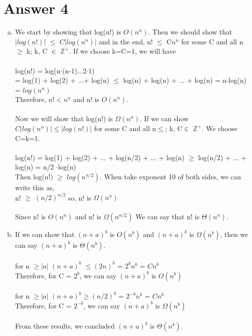 \documentclass[11pt]{article}
\begin{document}
\section*{Answer 4}
    \begin{enumerate}[(a)]
        \item 
            We start by showing that log(n!) is $O(n^n)$. Then we should show that $|log(n!)|$ $\leq$ $C|log(n^n)|$ and in the end, n! $\leq$ C$n^n$ for some C and all n $\geq$ k; k, C $\in$ $\mathbb{Z}^+$. If we choose k=C=1, we will have\\
            \\
            log(n!) = log(n$\cdot$(n-1)...2$\cdot$1) \\
            = log(1) + log(2) + ...+ log(n) $\leq$ log(n) + log(n) + ... + log(n) = n$\cdot$log(n) = $log(n^n)$\\
            Therefore, $n! < n^n$ \:\:\: and n! is $O(n^n)$.\\\\
            Now we will show that  log(n!) is $\Omega(n^n)$. If we can show $C|log(n^n)| \leq |log(n!)|$ for some C and all n$\leq$; k, C$\in$ $\mathbb{Z}^+$. We choose C=k=1.\\\\
            log(n!) = log(1) + log(2) + ... + log(n/2) + ... + log(n) $\geq$ log(n/2) + ... + log(n) = n/2 $\cdot$log(n)\\
            Then log(n!) $\geq$ $log(n^{n/2})$. When take exponent 10 of both sides, we can write this as,\\
            n! $\geq$ $(n/2)^{n/2}$ \:\:\: so, n! is $\Omega(n^{n})$\\\\
            Since n! is $O(n^n)$ and n! is $\Omega(n^{n/2})$ We can say that n! is $\Theta(n^n)$.\\
            
        \item
            If we can show that $(n+a)^b$ is $O(n^b)$ and $(n+a)^b$ is $\Omega(n^b)$, then we can say $(n+a)^b$ is $\Theta(n^b)$.\\\\
            for n $\geq |a|$ \:\:\:\: $(n+a)^b$ $\leq (2n)^b$ = $2^bn^b$ = $Cn^b$\\
            Therefore, for C = $2^b$, we can say $(n+a)^b$ is $O(n^b)$\\\\
            for n $\geq |a|$ \:\:\:\: $(n+a)^b \geq (n/2)^b$ = $2^{-b}n^b$ = $Cn^b$\\
            Therefore, for C = $2^{-b}$, we can say $(n+a)^b$ is $\Omega(n^b)$\\\\
            From these results, we concluded $(n+a)^b$ is $\Theta(n^b)$.\\

    \end{enumerate}
\newpage
\end{document}
